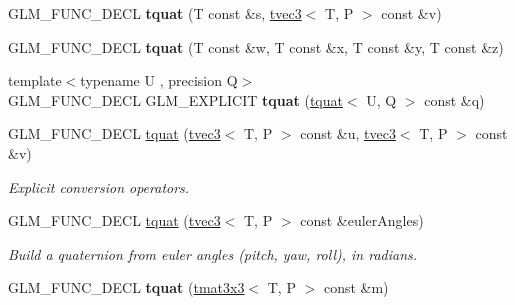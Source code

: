 \begin{DoxyCompactItemize}
\item 
\hypertarget{structglm_1_1tquat_ae51ec37de284fb018dd979f20b673774}{G\-L\-M\-\_\-\-F\-U\-N\-C\-\_\-\-D\-E\-C\-L {\bfseries tquat} (T const \&s, \hyperlink{structglm_1_1tvec3}{tvec3}$<$ T, P $>$ const \&v)}\label{structglm_1_1tquat_ae51ec37de284fb018dd979f20b673774}

\item 
\hypertarget{structglm_1_1tquat_aa0855864e82b48444daae5383ff89845}{G\-L\-M\-\_\-\-F\-U\-N\-C\-\_\-\-D\-E\-C\-L {\bfseries tquat} (T const \&w, T const \&x, T const \&y, T const \&z)}\label{structglm_1_1tquat_aa0855864e82b48444daae5383ff89845}

\item 
\hypertarget{structglm_1_1tquat_a2595e543aea979bd7db792af742d62d4}{{\footnotesize template$<$typename U , precision Q$>$ }\\G\-L\-M\-\_\-\-F\-U\-N\-C\-\_\-\-D\-E\-C\-L G\-L\-M\-\_\-\-E\-X\-P\-L\-I\-C\-I\-T {\bfseries tquat} (\hyperlink{structglm_1_1tquat}{tquat}$<$ U, Q $>$ const \&q)}\label{structglm_1_1tquat_a2595e543aea979bd7db792af742d62d4}

\item 
G\-L\-M\-\_\-\-F\-U\-N\-C\-\_\-\-D\-E\-C\-L \hyperlink{structglm_1_1tquat_a7557ed89af83fccd8b0a5d9ff92ce1b2}{tquat} (\hyperlink{structglm_1_1tvec3}{tvec3}$<$ T, P $>$ const \&u, \hyperlink{structglm_1_1tvec3}{tvec3}$<$ T, P $>$ const \&v)
\begin{DoxyCompactList}\small\item\em Explicit conversion operators. \end{DoxyCompactList}\item 
\hypertarget{structglm_1_1tquat_a7646d6d5140fefc3dee726818c515e52}{G\-L\-M\-\_\-\-F\-U\-N\-C\-\_\-\-D\-E\-C\-L \hyperlink{structglm_1_1tquat_a7646d6d5140fefc3dee726818c515e52}{tquat} (\hyperlink{structglm_1_1tvec3}{tvec3}$<$ T, P $>$ const \&euler\-Angles)}\label{structglm_1_1tquat_a7646d6d5140fefc3dee726818c515e52}

\begin{DoxyCompactList}\small\item\em Build a quaternion from euler angles (pitch, yaw, roll), in radians. \end{DoxyCompactList}\item 
\hypertarget{structglm_1_1tquat_ac5a9afaa3adfab8c6857137ace8699cd}{G\-L\-M\-\_\-\-F\-U\-N\-C\-\_\-\-D\-E\-C\-L {\bfseries tquat} (\hyperlink{structglm_1_1tmat3x3}{tmat3x3}$<$ T, P $>$ const \&m)}\label{structglm_1_1tquat_ac5a9afaa3adfab8c6857137ace8699cd}


\end{DoxyCompactItemize}
